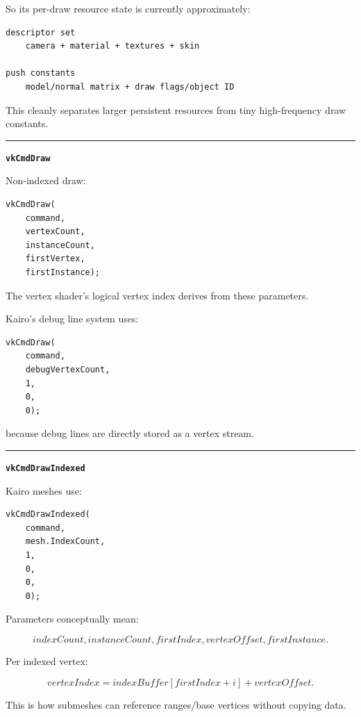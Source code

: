 So its per-draw resource state is currently approximately:

\begin{verbatim}
descriptor set
    camera + material + textures + skin

push constants
    model/normal matrix + draw flags/object ID
\end{verbatim}

This cleanly separates larger persistent resources from tiny high-frequency draw constants.

\begin{center}\rule{0.5\linewidth}{0.5pt}\end{center}

\textbf{\texttt{vkCmdDraw}}

Non-indexed draw:

\begin{verbatim}
vkCmdDraw(
    command,
    vertexCount,
    instanceCount,
    firstVertex,
    firstInstance);
\end{verbatim}

The vertex shader's logical vertex index derives from these parameters.

Kairo's debug line system uses:

\begin{verbatim}
vkCmdDraw(
    command,
    debugVertexCount,
    1,
    0,
    0);
\end{verbatim}

because debug lines are directly stored as a vertex stream.

\begin{center}\rule{0.5\linewidth}{0.5pt}\end{center}

\textbf{\texttt{vkCmdDrawIndexed}}

Kairo meshes use:

\begin{verbatim}
vkCmdDrawIndexed(
    command,
    mesh.IndexCount,
    1,
    0,
    0,
    0);
\end{verbatim}

Parameters conceptually mean:

\[
indexCount,
instanceCount,
firstIndex,
vertexOffset,
firstInstance.
\]

Per indexed vertex:

\[
vertexIndex
=
indexBuffer[firstIndex+i]
+
vertexOffset.
\]

This is how submeshes can reference ranges/base vertices without copying data.

